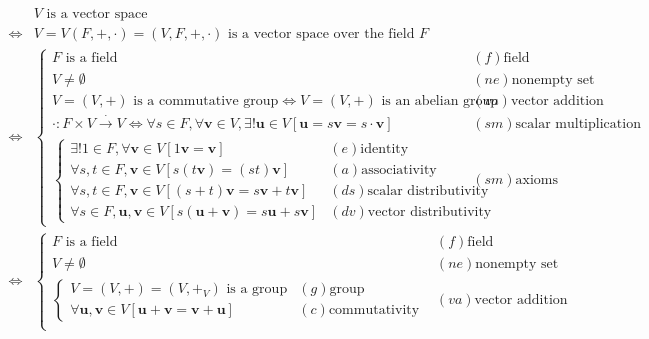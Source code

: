 \documentclass[
]{book}
\theoremstyle{definition}
\theoremstyle{definition}
\theoremstyle{definition}
\theoremstyle{definition}
\theoremstyle{remark}
\begin{document}
\[
\begin{aligned}
&V\text{ is a vector space}\\\Leftrightarrow&V=V\left(F,+,\cdot\right)=\left(V,F,+,\cdot\right)\text{ is a vector space over the field }F\\\Leftrightarrow&\begin{cases}
F\text{ is a field} & \left(f\right)\text{field}\\
V\ne\emptyset & \left(ne\right)\text{nonempty set}\\
V=\left(V,+\right)\text{ is a commutative group}\Leftrightarrow V=\left(V,+\right)\text{ is an abelian group} & \left(va\right)\text{vector addition}\\
\cdot:F\times V\overset{\cdot}{\rightarrow}V\Leftrightarrow\forall s\in F,\forall\boldsymbol{v}\in V,\exists!\boldsymbol{u}\in V\left[\boldsymbol{u}=s\boldsymbol{v}=s\cdot\boldsymbol{v}\right] & \left(sm\right)\text{scalar multiplication}\\
\begin{cases}
\exists!1\in F,\forall\boldsymbol{v}\in V\left[1\boldsymbol{v}=\boldsymbol{v}\right] & \left(e\right)\text{identity}\\
\forall s,t\in F,\boldsymbol{v}\in V\left[s\left(t\boldsymbol{v}\right)=\left(st\right)\boldsymbol{v}\right] & \left(a\right)\text{associativity}\\
\forall s,t\in F,\boldsymbol{v}\in V\left[\left(s+t\right)\boldsymbol{v}=s\boldsymbol{v}+t\boldsymbol{v}\right] & \left(ds\right)\text{scalar distributivity}\\
\forall s\in F,\boldsymbol{u},\boldsymbol{v}\in V\left[s\left(\boldsymbol{u}+\boldsymbol{v}\right)=s\boldsymbol{u}+s\boldsymbol{v}\right] & \left(dv\right)\text{vector distributivity}
\end{cases} & \left(sm\right)\text{axioms}
\end{cases}\\\Leftrightarrow&\begin{cases}
F\text{ is a field} & \left(f\right)\text{field}\\
V\ne\emptyset & \left(ne\right)\text{nonempty set}\\
\begin{cases}
V=\left(V,+\right)=\left(V,+_{{\scriptscriptstyle V}}\right)\text{ is a group} & \left(g\right)\text{group}\\
\forall\boldsymbol{u},\boldsymbol{v}\in V\left[\boldsymbol{u}+\boldsymbol{v}=\boldsymbol{v}+\boldsymbol{u}\right] & \left(c\right)\text{commutativity}
\end{cases} & \left(va\right)\text{vector addition}\\

\end{cases}
\end{aligned}\]
\end{document}
